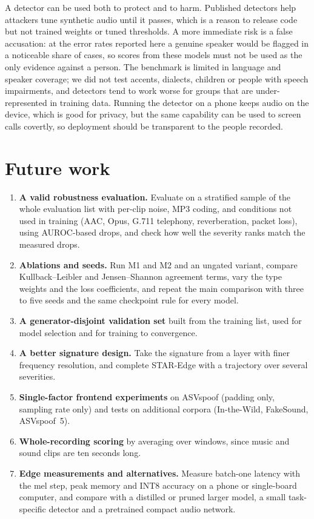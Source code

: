 A detector can be used both to protect and to harm. Published detectors help attackers tune synthetic audio until it passes, which is a reason to release code but not trained weights or tuned thresholds. A more immediate risk is a false accusation: at the error rates reported here a genuine speaker would be flagged in a noticeable share of cases, so scores from these models must not be used as the only evidence against a person. The benchmark is limited in language and speaker coverage; we did not test accents, dialects, children or people with speech impairments, and detectors tend to work worse for groups that are under-represented in training data. Running the detector on a phone keeps audio on the device, which is good for privacy, but the same capability can be used to screen calls covertly, so deployment should be transparent to the people recorded.

\section{Future work}

\begin{enumerate}[label=\textbf{\arabic*.},leftmargin=*,itemsep=0.3em]
  \item \textbf{A valid robustness evaluation.} Evaluate on a stratified sample of the whole evaluation list with per-clip noise, MP3 coding, and conditions not used in training (AAC, Opus, G.711 telephony, reverberation, packet loss), using AUROC-based drops, and check how well the severity ranks match the measured drops.
  \item \textbf{Ablations and seeds.} Run M1 and M2 and an ungated variant, compare Kullback--Leibler and Jensen--Shannon agreement terms, vary the type weights and the loss coefficients, and repeat the main comparison with three to five seeds and the same checkpoint rule for every model.
  \item \textbf{A generator-disjoint validation set} built from the training list, used for model selection and for training to convergence.
  \item \textbf{A better signature design.} Take the signature from a layer with finer frequency resolution, and complete STAR-Edge with a trajectory over several severities.
  \item \textbf{Single-factor frontend experiments} on ASVspoof (padding only, sampling rate only) and tests on additional corpora (In-the-Wild, FakeSound, ASVspoof~5).
  \item \textbf{Whole-recording scoring} by averaging over windows, since music and sound clips are ten seconds long.
  \item \textbf{Edge measurements and alternatives.} Measure batch-one latency with the mel step, peak memory and INT8 accuracy on a phone or single-board computer, and compare with a distilled or pruned larger model, a small task-specific detector and a pretrained compact audio network.
\end{enumerate}

